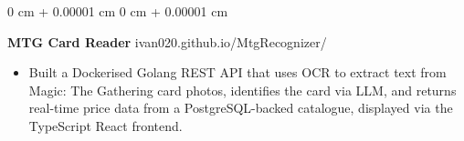 \documentclass[6pt, letterpaper]{article}
\newenvironment{highlights}{
    \begin{itemize}[
        topsep=0.03 cm,
        parsep=0.03 cm,
        partopsep=0pt,
        itemsep=0pt,
        leftmargin=0 cm + 10pt
    ]
}{
    \end{itemize}
} %
\newenvironment{onecolentry}{
    \begin{adjustwidth}{
        0 cm + 0.00001 cm
    }{
        0 cm + 0.00001 cm
    }
}{
    \end{adjustwidth}
} %
\begin{document}


    \begin{onecolentry}
        \textbf{MTG Card Reader} \hfill ivan020.github.io/MtgRecognizer/

        \begin{highlights}

            \item Built a Dockerised Golang REST API that uses OCR to extract text from Magic: The Gathering card photos, identifies the card via LLM, and returns real-time price data from a PostgreSQL-backed catalogue, displayed via the TypeScript React frontend.

        \end{highlights}
    \end{onecolentry}
\end{document}
